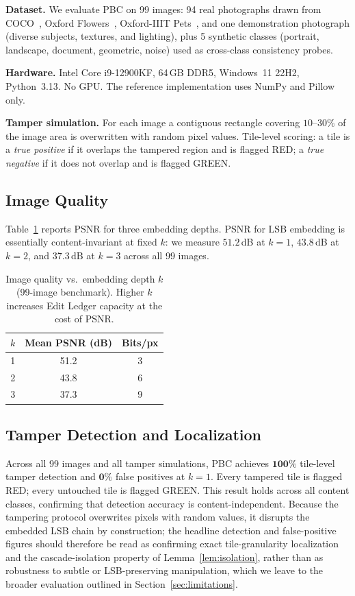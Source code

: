 \documentclass[conference]{IEEEtran}
\begin{document}
\textbf{Dataset.} We evaluate PBC on 99 images: 94 real photographs
drawn from COCO~\cite{coco_dataset}, Oxford Flowers~\cite{flowers_dataset},
Oxford-IIIT Pets~\cite{pets_dataset}, and one demonstration photograph
(diverse subjects, textures, and lighting), plus 5 synthetic classes
(portrait, landscape, document, geometric, noise) used as cross-class
consistency probes.

\textbf{Hardware.} Intel Core i9-12900KF, 64\,GB DDR5, Windows~11
22H2, Python~3.13. No GPU. The reference implementation uses NumPy
and Pillow only.

\textbf{Tamper simulation.} For each image a contiguous rectangle
covering $10$--$30\%$ of the image area is overwritten with random
pixel values. Tile-level scoring: a tile is a \emph{true positive} if
it overlaps the tampered region and is flagged RED; a \emph{true
negative} if it does not overlap and is flagged GREEN.

\subsection{Image Quality}

Table~\ref{tab:psnr} reports PSNR for three embedding depths. PSNR for
LSB embedding is essentially content-invariant at fixed $k$: we
measure $51.2$\,dB at $k{=}1$, $43.8$\,dB at $k{=}2$, and $37.3$\,dB
at $k{=}3$ across all 99 images.

\begin{table}[t]
  \centering
  \caption{Image quality vs.\ embedding depth $k$ (99-image benchmark).
    Higher $k$ increases Edit Ledger capacity at the cost of PSNR.}
  \label{tab:psnr}
  \begin{tabular}{ccc}
    \toprule
    $k$ & Mean PSNR (dB) & Bits/px \\
    \midrule
    1 & 51.2 & 3 \\
    2 & 43.8 & 6 \\
    3 & 37.3 & 9 \\
    \bottomrule
  \end{tabular}
\end{table}

\subsection{Tamper Detection and Localization}

Across all 99 images and all tamper simulations, PBC achieves
$\mathbf{100\%}$ tile-level tamper detection and $\mathbf{0\%}$ false
positives at $k{=}1$. Every tampered tile is flagged RED; every
untouched tile is flagged GREEN. This result holds across all content
classes, confirming that detection accuracy is content-independent. Because the tampering protocol overwrites pixels with random values, it disrupts the embedded LSB chain by construction; the headline detection and false-positive figures should therefore be read as confirming exact tile-granularity localization and the cascade-isolation property of Lemma~\ref{lem:isolation}, rather than as robustness to subtle or LSB-preserving manipulation, which we leave to the broader evaluation outlined in Section~\ref{sec:limitations}.
\end{document}
